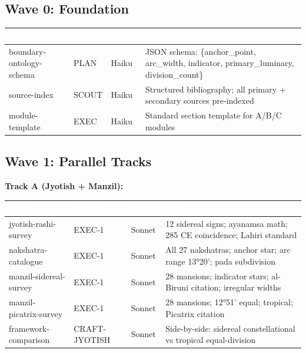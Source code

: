 \documentclass[11pt,letterpaper]{article}
\newcommand{\tableheader}[1]{\textbf{\sffamily\textcolor{white}{#1}}}
\begin{document}
\subsection{Wave 0: Foundation}

\begin{center}
\begin{tabularx}{\textwidth}{L{3cm}L{2cm}L{2cm}X}
\toprule
{}
\tableheader{Task} & \tableheader{Agent} & \tableheader{Model} & \tableheader{Spec} \\
\midrule
boundary-ontology-schema & PLAN & Haiku & JSON schema: \{anchor\_point, arc\_width, indicator, primary\_luminary, division\_count\} \\
source-index & SCOUT & Haiku & Structured bibliography; all primary + secondary sources pre-indexed \\
module-template & EXEC & Haiku & Standard section template for A/B/C modules \\
\bottomrule
\end{tabularx}
\end{center}

\subsection{Wave 1: Parallel Tracks}

\textbf{Track A (Jyotish + Manzil):}

\begin{center}
\begin{tabularx}{\textwidth}{L{3cm}L{2cm}L{2cm}X}
\toprule
{}
\tableheader{Task} & \tableheader{Agent} & \tableheader{Model} & \tableheader{Spec} \\
\midrule
jyotish-rashi-survey & EXEC-1 & Sonnet & 12 sidereal signs; ayanamsa math; 285 CE coincidence; Lahiri standard \\
nakshatra-catalogue & EXEC-1 & Sonnet & All 27 nakshatras; anchor star; arc range 13°20'; pada subdivision \\
manzil-sidereal-survey & EXEC-1 & Sonnet & 28 mansions; indicator stars; al-Biruni citation; irregular widths \\
manzil-picatrix-survey & EXEC-1 & Sonnet & 28 mansions; 12°51' equal; tropical; Picatrix citation \\
framework-comparison & CRAFT-JYOTISH & Sonnet & Side-by-side: sidereal constellational vs tropical equal-division \\
\bottomrule
\end{tabularx}
\end{center}
\end{document}
